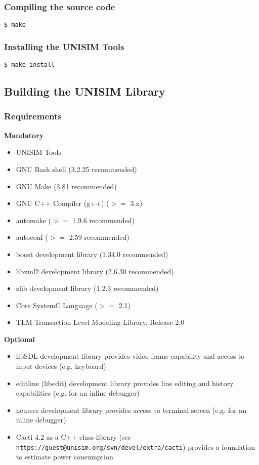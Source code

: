 \subsubsection{Compiling the source code}

\begin{verbatim}
$ make
\end{verbatim}

\subsubsection{Installing the UNISIM Tools}

\begin{verbatim}
$ make install
\end{verbatim}


\subsection{Building the UNISIM Library}

\subsubsection{Requirements}

\noindent \textbf{Mandatory}

\begin{itemize}
\item UNISIM Tools
\item GNU Bash shell (3.2.25 recommended)
\item GNU Make (3.81 recommended)
\item GNU C++ Compiler (g++) ($>=$ 3.x)
\item automake ($>=$ 1.9.6 recommended)
\item autoconf ($>=$ 2.59 recommended)
\item boost development library (1.34.0 recommended)
\item libxml2 development library (2.6.30 recommended)
\item zlib development library (1.2.3 recommended)
\item Core SystemC Language ($>=$ 2.1)
\item TLM Transaction Level Modeling Library, Release 2.0
\end{itemize}

\noindent \textbf{Optional}

\begin{itemize}
\item libSDL development library provides video frame capability and access to input devices (e.g. keyboard)
\item editline (libedit) development library provides line editing and history capabilities (e.g. for an inline debugger)
\item ncurses development library provides access to terminal screen (e.g. for an inline debugger)
\item Cacti 4.2 as a C++ class library (see \texttt{https://guest@unisim.org/svn/devel/extra/cacti}) provides a foundation to estimate power consumption
\end{itemize}

